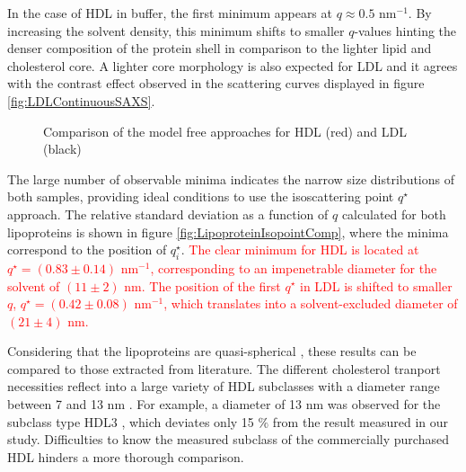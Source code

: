In the case of HDL in buffer, the first minimum appears at $q\approx0.5$ nm$^{-1}$. By increasing the solvent density, this minimum shifts to smaller $q$-values hinting the denser composition of the protein shell in comparison to the lighter lipid and cholesterol core. A lighter core morphology is also expected for LDL \citep{luzzati_structure_1979} and it agrees with the contrast effect observed in the scattering curves displayed in figure \ref{fig:LDLContinuousSAXS}.

\begin{figure}
	\centering
		\qquad
		\caption[Model free-approaches to the experimental data of HDL and LDL.]{Comparison of the model free approaches for HDL (red) and LDL (black)}
\end{figure}

The large number of observable minima indicates the narrow size distributions of both samples, providing ideal conditions to use the isoscattering point $q^{\star}$ approach. The relative standard deviation as a function of $q$ calculated for both lipoproteins is shown in figure \ref{fig:LipoproteinIsopointComp}, where the minima correspond to the position of $q^{\star}_i$. \textcolor{red}{The clear minimum for HDL is located at $q^{\star}=\left( 0.83 \pm 0.14 \right)$ nm$^{-1}$, corresponding to an impenetrable diameter for the solvent of $\left( 11 \pm 2 \right)$ nm. The position of the first $q^{\star}$ in LDL is shifted to smaller $q$, $q^{\star}= \left( 0.42 \pm 0.08 \right)$ nm$^{-1}$, which translates into a solvent-excluded diameter of $\left( 21 \pm 4 \right)$ nm.}

Considering that the lipoproteins are quasi-spherical \citep{stuhrmann_neutron_1975}, these results can be compared to those extracted from literature. The different cholesterol tranport necessities reflect into a large variety of HDL subclasses with a diameter range between 7 and 13 nm \citep{german_lipoproteins:_2006}. For example, a diameter of 13 nm was observed for the subclass type HDL3 \citep{tardieu_structure_1976}, which deviates only 15 $\%$ from the result measured in our study. Difficulties to know the measured subclass of the commercially purchased HDL hinders a more thorough comparison.

